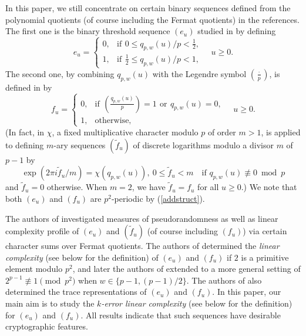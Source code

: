 \documentclass [11pt,a4paper]{article}
\begin{document}
In this paper, we still concentrate on certain binary sequences defined from the polynomial quotients (of course including the Fermat quotients) in the references.
The first one is the binary threshold sequence $(e_u)$ studied in \cite{CD,CG,CHD,COW,CW4,DKC} by defining
\begin{equation}\label{binarythreshold}
e_u=\left\{
\begin{array}{ll}
0, & \mathrm{if}\,\ 0\leq q_{p,w}(u)/p< \frac{1}{2},\\
1, & \mathrm{if}\,\ \frac{1}{2}\leq q_{p,w}(u)/p< 1,
\end{array}
\right. \quad  u \ge 0.
\end{equation}
The second one, by combining $q_{p,w}(u)$ with the Legendre symbol
$\left( \frac{\cdot}{p} \right)$, is defined in \cite{CHD,CW4,DKC,GW} by
\begin{equation}\label{binarylegendre}
f_u=\left\{
\begin{array}{ll}
0, & \mathrm{if}\,\ \left(\frac{q_{p,w}(u)}{p}\right)=1\,\ \mathrm{or}\,\ q_{p,w}(u)=0, \\
1, & \mathrm{otherwise},
\end{array}
\right. \quad u \ge 0.
\end{equation}
(In fact, in \cite{DKC,GW} $\chi$, a fixed multiplicative
character modulo $p$ of order $m>1$, is applied to defining $m$-ary sequences $(\widetilde{f}_u)$ of
discrete logarithms modulo a divisor $m$ of $p-1$ by
$$
  \exp(2\pi i \widetilde{f}_u/m)=
     \chi(q_{p,w}(u)),~ 0\le \widetilde{f}_u<m \quad \mbox{if } q_{p,w}(u)\not\equiv 0\bmod p
$$
and $\widetilde{f}_u=0$ otherwise. When $m=2$, we have $\widetilde{f}_u=f_u$ for all $u\ge 0$.) We note that both $(e_u)$ and $(f_u)$ are $p^2$-periodic by (\ref{addstruct}).


The authors of \cite{COW,GW} investigated measures of pseudorandomness as well as linear complexity profile of
$(e_u)$ and $(\widetilde{f}_u)$ (of course including $(f_u)$) via certain character sums over Fermat quotients.
The authors of \cite{CHD,DKC}  determined the \emph{linear complexity} (see
 below for the definition) of $(e_u)$ and $(f_u)$ if $2$ is a primitive element modulo $p^2$, and later the authors of \cite{CD,CG,CW4}  extended to a more general setting of $2^{p-1}\not\equiv 1 \pmod {p^2}$ when $w\in \{p-1, (p-1)/2\}$. The authors of \cite{CW4}  also determined the  trace representations of $(e_u)$ and $(f_u)$. In this paper, our main aim is to study the \emph{$k$-error linear complexity} (see  below for the definition) for $(e_u)$ and $(f_u)$.
All results indicate that such sequences have desirable cryptographic features.
\end{document}
